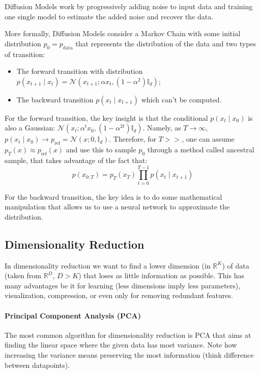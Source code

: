\documentclass{article}
\newcommand{\R}{\mathbb{R}}
\begin{document}
Diffusion Models work by progressively adding noise to input data and training one single model to estimate the added noise and recover the data.

More formally, Diffusion Models consider a Markov Chain with some initial distribution $p_0 = p_\text{data}$ that represents the distribution of the data and two types of transition:
\begin{itemize}
    \item The forward transition with distribution $p(x_{t+1} \mid x_t) = \mathcal{N}(x_{t+1} ; \alpha x_t, (1-\alpha^2) \mathbb{I}_d)$;
    \item The backward transition $p(x_t \mid x_{t+1})$ which can't be computed.
\end{itemize}

For the forward transition, the key insight is that the conditional $p(x_t \mid x_0)$ is also a Gaussian: $\mathcal{N}(x_t ; \alpha^t x_0, (1-\alpha^{2t}) \mathbb{I}_d)$.
Namely, as $T \to \infty$, $p(x_t \mid x_0) \to p_\text{ref} = \mathcal{N}(x ; 0, \mathbb{I}_d)$.
Therefore, for $T >>$, one can assume $p_T(x) \approx p_\text{ref}(x)$ and use this to sample $p_0$ through a method called ancestral sample, that takes advantage of the fact that:
$$
p(x_{0:T}) = p_T(x_T) \prod_{t=0}^{T-1} p(x_t \mid x_{t+1})
$$

For the backward transition, the key idea is to do some mathematical manipulation that allows us to use a neural network to approximate the distribution.

\subsection{Dimensionality Reduction}

In dimensionality reduction we want to find a lower dimension (in $\R^K$) of data (taken from $\R^D$, $D>K$) that loses as little information as possible.
This has many advantages be it for learning (less dimensions imply less parameters), visualization, compression, or even only for removing redundant features.

\paragraph{Principal Component Analysis (PCA)}

The most common algorithm for dimensionality reduction is PCA that aims at finding the linear space where the given data has most variance.
Note how increasing the variance means preserving the most information (think difference between datapoints).
\end{document}
